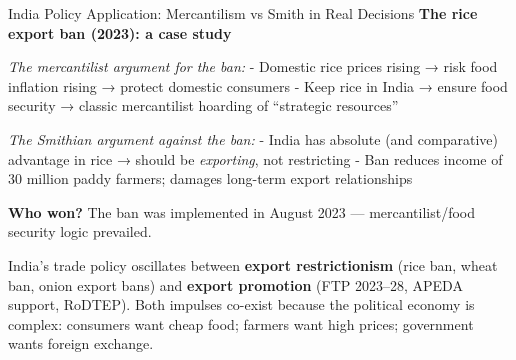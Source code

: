 \documentclass[
  ignorenonframetext,
  aspectratio=169,
]{beamer}
\makeatletter
\let\quarto@originallabel\label
\DeclareRobustCommand*{\label}[1]{\quarto@originallabel{#1}}
\makeatother
\begin{document}
\begin{frame}{India Policy Application: Mercantilism vs Smith in Real
Decisions}
\label{india-policy-application-mercantilism-vs-smith-in-real-decisions}
\textbf{The rice export ban (2023): a case study}

\emph{The mercantilist argument for the ban:} - Domestic rice prices
rising → risk food inflation rising → protect domestic consumers - Keep
rice in India → ensure food security → classic mercantilist hoarding of
``strategic resources''

\emph{The Smithian argument against the ban:} - India has absolute (and
comparative) advantage in rice → should be \emph{exporting}, not
restricting - Ban reduces income of 30 million paddy farmers; damages
long-term export relationships

\textbf{Who won?} The ban was implemented in August 2023 ---
mercantilist/food security logic prevailed.

India's trade policy oscillates between \textbf{export restrictionism}
(rice ban, wheat ban, onion export bans) and \textbf{export promotion}
(FTP 2023--28, APEDA support, RoDTEP). Both impulses co-exist because
the political economy is complex: consumers want cheap food; farmers
want high prices; government wants foreign exchange.
\end{frame}
\end{document}
